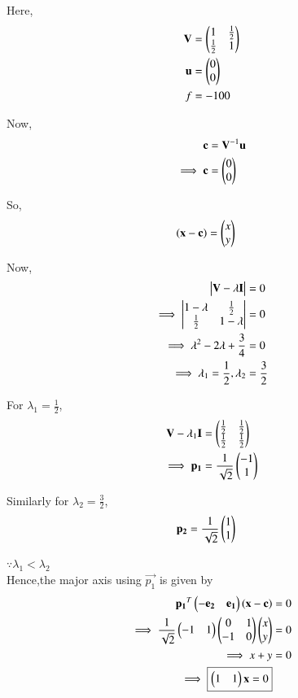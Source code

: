 \begin{enumerate}
    Here,
    \begin{align}
    \mathbf{V} &= \begin{pmatrix}1 & \frac{1}{2} \\ \frac{1}{2} & 1\end{pmatrix} \\
    \mathbf{u} &= \begin{pmatrix}0 \\ 0\end{pmatrix} \\
    f &= -100
    \end{align}

    Now,
    \begin{align}
    \mathbf{c} &= \mathbf{V}^{-1}\mathbf{u}\\
    \implies \mathbf{c} &= \begin{pmatrix}0 \\ 0\end{pmatrix}
    \end{align}

    So,
    \begin{align}
    \left(\mathbf{x}-\mathbf{c}\right) &= \begin{pmatrix}x \\ y\end{pmatrix}
    \end{align}
    
    Now,
    \begin{align}
        \begin{vmatrix}\mathbf{V}-\lambda\mathbf{I}\end{vmatrix} &= 0 \\
        \implies \begin{vmatrix}1-\lambda & \frac{1}{2} \\ \frac{1}{2} & 1-\lambda\end{vmatrix} &= 0 \\
        \implies \lambda^2-2\lambda+\frac{3}{4} &= 0 \\
        \implies \lambda_1 =\frac{1}{2},\lambda_2 &= \frac{3}{2}
    \end{align}
    
    For $\lambda_1=\frac{1}{2}$,
    \begin{align}
        \mathbf{V}-\lambda_1\mathbf{I} &= \begin{pmatrix}\frac{1}{2} & \frac{1}{2} \\ \frac{1}{2} & \frac{1}{2}\end{pmatrix} \\
        \implies \mathbf{p_1} &= \frac{1}{\sqrt{2}}\begin{pmatrix}-1 \\ 1\end{pmatrix}
    \end{align}
    
    Similarly for $\lambda_2=\frac{3}{2}$,
    \begin{align}
        \mathbf{p_2} &= \frac{1}{\sqrt{2}}\begin{pmatrix}1 \\ 1\end{pmatrix}
    \end{align}
    
    $\because \lambda_1<\lambda_2$ \\
    Hence,the major axis using $\vec{p_1}$ is given by
    \begin{align}
        \mathbf{p_1}^T\begin{pmatrix}-\mathbf{e_2} & \mathbf{e_1}\end{pmatrix}\left(\mathbf{x}-\mathbf{c}\right) &= 0 \\
        \implies \frac{1}{\sqrt{2}}\begin{pmatrix}-1 & 1\end{pmatrix}\begin{pmatrix}0 & 1 \\ -1 & 0\end{pmatrix}\begin{pmatrix}x \\ y\end{pmatrix} &= 0 \\
        \implies x+y &= 0 \\
        \implies \boxed{\begin{pmatrix}1 & 1\end{pmatrix}\mathbf{x} =0}
    \end{align}
    

\end{enumerate}
